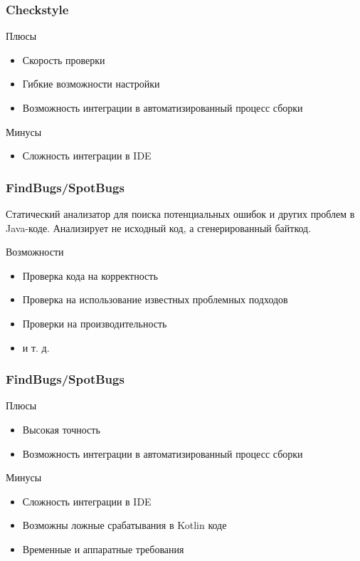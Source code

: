 \documentclass{beamer}
\begin{document}
\begin{frame}
    \frametitle{Checkstyle}
    \begin{block}{Плюсы}
        \begin{itemize}
            \item{Скорость проверки}
            \item{Гибкие возможности настройки}
            \item{Возможность интеграции в автоматизированный процесс сборки}
        \end{itemize}
    \end{block}
    \begin{block}{Минусы}
        \begin{itemize}
            \item{Сложность интеграции в IDE}
        \end{itemize}
    \end{block}
\end{frame}

\begin{frame}
    \frametitle{FindBugs/SpotBugs}
    Статический анализатор для поиска потенциальных ошибок и других проблем в
    Java-коде. Анализирует не исходный код, а сгенерированный байткод.
    \begin{block}{Возможности}
        \begin{itemize}
            \item{Проверка кода на корректность}
            \item{Проверка на использование известных проблемных подходов}
            \item{Проверки на производительность}
            \item{и т. д.}
        \end{itemize}
    \end{block}
\end{frame}

\begin{frame}
    \frametitle{FindBugs/SpotBugs}
    \begin{block}{Плюсы}
        \begin{itemize}
            \item{Высокая точность}
            \item{Возможность интеграции в автоматизированный процесс сборки}
        \end{itemize}
    \end{block}
    \begin{block}{Минусы}
        \begin{itemize}
            \item{Сложность интеграции в IDE}
            \item{Возможны ложные срабатывания в Kotlin коде}
            \item{Временные и аппаратные требования}
        \end{itemize}
    \end{block}
\end{frame}
\end{document}
